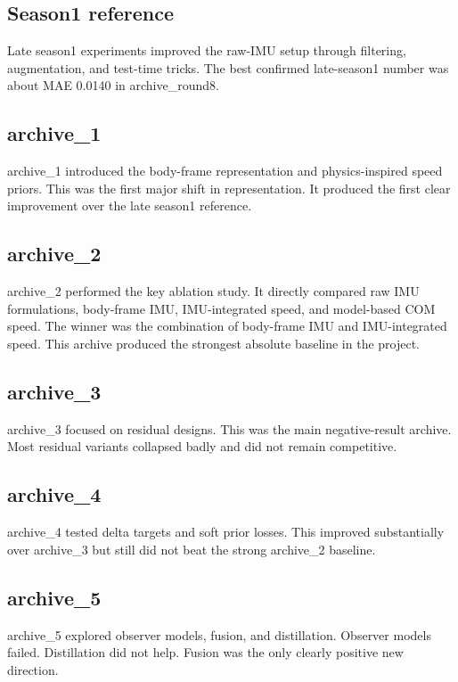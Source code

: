 \documentclass[11pt,a4paper]{article}
\begin{document}
\subsection{Season1 reference}

Late season1 experiments improved the raw-IMU setup through filtering, augmentation, and test-time tricks. The best confirmed late-season1 number was about MAE 0.0140 in archive\_round8.

\subsection{archive\_1}

archive\_1 introduced the body-frame representation and physics-inspired speed priors. This was the first major shift in representation. It produced the first clear improvement over the late season1 reference.

\subsection{archive\_2}

archive\_2 performed the key ablation study. It directly compared raw IMU formulations, body-frame IMU, IMU-integrated speed, and model-based COM speed. The winner was the combination of body-frame IMU and IMU-integrated speed. This archive produced the strongest absolute baseline in the project.

\subsection{archive\_3}

archive\_3 focused on residual designs. This was the main negative-result archive. Most residual variants collapsed badly and did not remain competitive.

\subsection{archive\_4}

archive\_4 tested delta targets and soft prior losses. This improved substantially over archive\_3 but still did not beat the strong archive\_2 baseline.

\subsection{archive\_5}

archive\_5 explored observer models, fusion, and distillation. Observer models failed. Distillation did not help. Fusion was the only clearly positive new direction.
\end{document}

